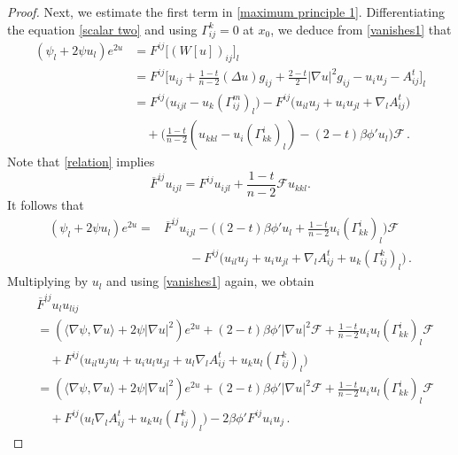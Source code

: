 \documentclass{article}
\theoremstyle{plain}
\theoremstyle{definition}
\theoremstyle{definition}
\numberwithin{equation}{section}
\begin{document}
\begin{sloppypar}
\begin{proof}
Next, we estimate the first term in \eqref{maximum principle 1}. Differentiating the equation \eqref{scalar two} and using $\Gamma_{ij}^{k}=0$ at $x_0$, we deduce from \eqref{vanishes1} that
\begin{equation*}
\begin{split}
(\psi_{l}+2\psi u_{l})e^{2u}&=F^{ij}\big[(W[u])_{ij}\big]_{l}\\
&=F^{ij}\big[u_{ij}+\frac{1-t}{n-2}(\Delta u)g_{ij}+\frac{2-t}{2}|\nabla u|^2g_{ij}-u_{i}u_{j}-A^{t}_{ij}\big]_{l}\\
&=F^{ij}\big(u_{ijl}-u_{k}(\Gamma_{ij}^{m})_{l} \big)-F^{ij}\big(u_{il}u_{j}+u_{i}u_{jl}+\nabla_{l}A^{t}_{ij}\big)\\
& \quad +\Big(\frac{1-t}{n-2}(u_{kkl}-u_{i}(\Gamma_{kk}^{i})_{l})-(2-t)\beta\phi' u_{l}\Big)\mathcal{F}\,.
\end{split}
\end{equation*}
Note that \eqref{relation} implies
\[
\overline{F}^{ij}u_{ijl}=F^{ij}u_{ijl}+\frac{1-t}{n-2}\mathcal{F}u_{kkl}.
\]
It follows that
\begin{equation*}
\begin{split}
(\psi_{l}+2\psi u_{l})e^{2u}
=&\overline{F}^{ij}u_{ijl}-\Big((2-t)\beta\phi' u_{l}+\frac{1-t}{n-2}u_{i}(\Gamma_{kk}^{i})_{l}\Big)\mathcal{F}\\
&\qquad -F^{ij}\big(u_{il}u_{j}+u_{i}u_{jl}+\nabla_{l}A^{t}_{ij}+u_{k}(\Gamma_{ij}^{k})_{l}\big)\,.
\end{split}
\end{equation*}
Multiplying by $u_{l}$ and using \eqref{vanishes1} again, we obtain
\begin{equation}\label{13terms}
\begin{split}
&\overline{F}^{ij}u_{l}u_{lij}\\
&=(\langle \nabla \psi, \nabla u\rangle +2\psi|\nabla u|^2)e^{2u}+(2-t)\beta\phi' |\nabla u|^2\mathcal{F}+\frac{1-t}{n-2}u_{i}u_{l}(\Gamma_{kk}^{i})_{l} \mathcal{F}\\
&\quad +F^{ij}\big(u_{il}u_{j}u_{l}+u_{i}u_{l}u_{jl}+u_{l}\nabla_{l}A^{t}_{ij}+u_{k}u_{l}(\Gamma_{ij}^{k})_{l}\big)\\
&=(\langle \nabla \psi, \nabla u\rangle +2\psi|\nabla u|^2)e^{2u}+ (2-t)\beta\phi' |\nabla u|^2\mathcal{F}+\frac{1-t}{n-2}u_{i}u_{l}(\Gamma_{kk}^{i})_{l} \mathcal{F}\\
&\quad +F^{ij}\big(u_{l}\nabla_{l}A^{t}_{ij}+u_{k}u_{l}(\Gamma_{ij}^{k})_{l}\big)-2\beta\phi' F^{ij}u_{i}u_{j}\,.
\end{split}
\end{equation}


\end{proof}
\end{sloppypar}
\end{document}
